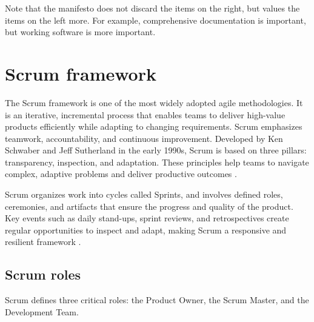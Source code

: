 Note that the manifesto does not discard the items on the right, but values the items on
the left more.  For example, comprehensive documentation is important, but working software
is more important.

\section{Scrum framework}

The Scrum framework is one of the most widely adopted agile methodologies. It is an
iterative, incremental process that enables teams to deliver high-value products
efficiently while adapting to changing requirements. Scrum emphasizes teamwork,
accountability, and continuous improvement. Developed by Ken Schwaber and Jeff Sutherland
in the early 1990s, Scrum is based on three pillars: transparency, inspection, and
adaptation. These principles help teams to navigate complex, adaptive problems and deliver
productive outcomes \parencite{schwaber2020scrum}.

Scrum organizes work into cycles called Sprints, and involves defined roles, ceremonies,
and artifacts that ensure the progress and quality of the product. Key events such as
daily stand-ups, sprint reviews, and retrospectives create regular opportunities to inspect
and adapt, making Scrum a responsive and resilient framework \parencite{denning2016scrum}.

\subsection{Scrum roles}

Scrum defines three critical roles: the Product Owner, the Scrum Master, and the
Development Team.

